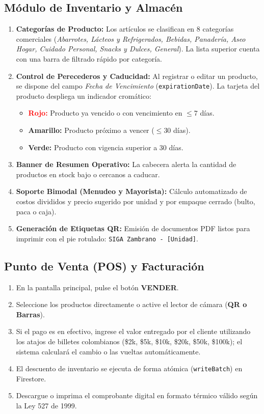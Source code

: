 \documentclass[12pt,a4paper]{article}
\begin{document}
\subsection{Módulo de Inventario y Almacén}
\begin{enumerate}
    \item \textbf{Categorías de Producto:} Los artículos se clasifican en 8 categorías comerciales (\textit{Abarrotes, Lácteos y Refrigerados, Bebidas, Panadería, Aseo Hogar, Cuidado Personal, Snacks y Dulces, General}). La lista superior cuenta con una barra de filtrado rápido por categoría.
    \item \textbf{Control de Perecederos y Caducidad:} Al registrar o editar un producto, se dispone del campo \textit{Fecha de Vencimiento} (\texttt{expirationDate}). La tarjeta del producto despliega un indicador cromático:
    \begin{itemize}
        \item \textcolor{red}{\textbf{Rojo:}} Producto ya vencido o con vencimiento en $\le 7$ días.
        \item \textcolor{unadorange}{\textbf{Amarillo:}} Producto próximo a vencer ($\le 30$ días).
        \item \textcolor{emeraldgreen}{\textbf{Verde:}} Producto con vigencia superior a 30 días.
    \end{itemize}
    \item \textbf{Banner de Resumen Operativo:} La cabecera alerta la cantidad de productos en stock bajo o cercanos a caducar.
    \item \textbf{Soporte Bimodal (Menudeo y Mayorista):} Cálculo automatizado de costos divididos y precio sugerido por unidad y por empaque cerrado (bulto, paca o caja).
    \item \textbf{Generación de Etiquetas QR:} Emisión de documentos PDF listos para imprimir con el pie rotulado: \texttt{SIGA Zambrano - [Unidad]}.
\end{enumerate}

\subsection{Punto de Venta (POS) y Facturación}
\begin{enumerate}
    \item En la pantalla principal, pulse el botón \textbf{VENDER}.
    \item Seleccione los productos directamente o active el lector de cámara (\textbf{QR o Barras}).
    \item Si el pago es en efectivo, ingrese el valor entregado por el cliente utilizando los atajos de billetes colombianos (\$2k, \$5k, \$10k, \$20k, \$50k, \$100k); el sistema calculará el cambio o las vueltas automáticamente.
    \item El descuento de inventario se ejecuta de forma atómica (\texttt{writeBatch}) en Firestore.
    \item Descargue o imprima el comprobante digital en formato térmico válido según la Ley 527 de 1999.
\end{enumerate}
\end{document}
